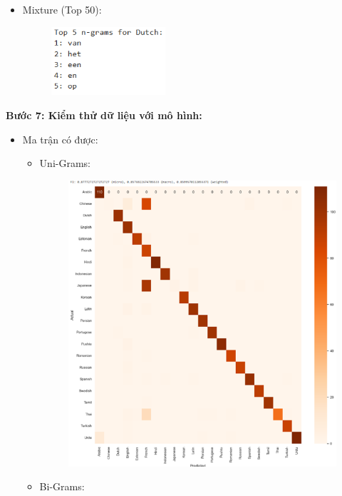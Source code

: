 \begin{itemize}
\begin{figure}[H]
\end{figure}
    \item Mixture (Top 50):
    \begin{figure}[H]
    \centering
    \includegraphics[width=0.4\textwidth]{img/docspics/Picture35.png}
\end{figure}
\end{itemize}
\clearpage
\textbf{Bước 7: Kiểm thử dữ liệu với mô hình:}

\begin{itemize}
    \item Ma trận có được:
    \begin{itemize}
        \item Uni-Grams:
        \begin{figure}[H]
    \centering
    \includegraphics[width=1\textwidth]{img/docspics/Picture36.png}
\end{figure}
\clearpage
        \item Bi-Grams:

\end{itemize}
\end{itemize}
